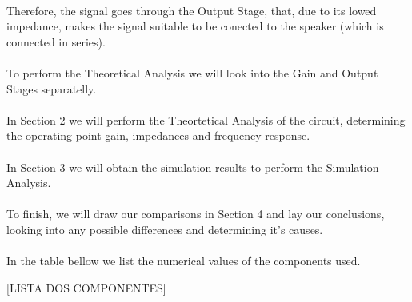 \paragraph{} Therefore, the signal goes through the Output Stage, that, due to its lowed impedance, makes the signal suitable to be conected to the speaker (which is connected in series).

\paragraph{} To perform the Theoretical Analysis we will look into the Gain and Output Stages separatelly.

\paragraph{} In Section 2 we will perform the Theortetical Analysis of the circuit, determining the operating point gain, impedances and frequency response.

\paragraph{} In Section 3 we will obtain the simulation results to perform the Simulation Analysis.

\paragraph{} To finish, we will draw our comparisons in Section 4 and lay our conclusions, looking into any possible differences and determining it's causes.

\paragraph{} In the table bellow we list the numerical values of the components used.

[LISTA DOS COMPONENTES]

\clearpage
